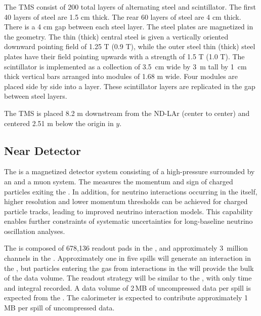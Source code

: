 \documentclass[../main-v1.tex]{subfiles}
\begin{document}
The TMS consist of 200 total layers of alternating steel and scintillator. The first 40 layers of steel are 1.5 cm thick. The rear 60 layers of steel are 4 cm thick. There is a 4 cm gap between each steel layer. The steel plates are magnetized in the geometry. The thin (thick) central steel is given a vertically oriented downward pointing field of 1.25 T (0.9 T), while the outer steel thin (thick) steel plates have their field pointing upwards with a strength of 1.5 T (1.0 T). The scintillator is implemented as a collection of 3.5~cm wide by 3~m tall by 1~cm thick vertical bars arranged into modules of 1.68 m wide. Four modules are placed side by side into a layer. These scintillator layers are replicated in the gap between steel layers.  

The TMS is placed 8.2 m downstream from the ND-LAr (center to center) and centered 2.51 m below the origin in $y$. 

\subsection{Near Detector  }
\label{sec:comp-dataestimates-mpd}

The  is a magnetized detector system consisting of a high-pressure  surrounded by an  and a muon system. The  measures the momentum and sign of charged particles exiting the . In addition, for neutrino interactions occurring in the  itself, higher resolution and lower momentum thresholds can be achieved for charged particle tracks, leading to improved neutrino interaction models. This capability enables further constraints of systematic uncertainties for long-baseline neutrino  oscillation analyses.

The  is composed of 678,136 readout pads in the , and approximately 3~million channels in the .  Approximately one in five spills will generate an interaction in the , but particles entering the gas from interactions in the  will provide the bulk of the data volume.  The readout strategy will be similar to the , with only time and integral recorded. A  data volume of 2\,MB of uncompressed data per spill is expected from the .  The calorimeter is expected to contribute approximately 1\,MB per spill of uncompressed data.

\end{document}
